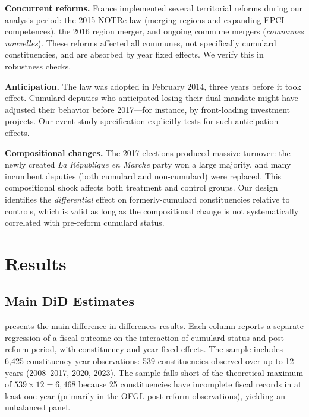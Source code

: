 \documentclass[12pt]{article}
\begin{document}
\textbf{Concurrent reforms.} France implemented several territorial reforms during our analysis period: the 2015 NOTRe law (merging regions and expanding EPCI competences), the 2016 region merger, and ongoing commune mergers (\textit{communes nouvelles}). These reforms affected all communes, not specifically cumulard constituencies, and are absorbed by year fixed effects. We verify this in robustness checks.

\textbf{Anticipation.} The law was adopted in February 2014, three years before it took effect. Cumulard deputies who anticipated losing their dual mandate might have adjusted their behavior before 2017---for instance, by front-loading investment projects. Our event-study specification explicitly tests for such anticipation effects.

\textbf{Compositional changes.} The 2017 elections produced massive turnover: the newly created \textit{La République en Marche} party won a large majority, and many incumbent deputies (both cumulard and non-cumulard) were replaced. This compositional shock affects both treatment and control groups. Our design identifies the \textit{differential} effect on formerly-cumulard constituencies relative to controls, which is valid as long as the compositional change is not systematically correlated with pre-reform cumulard status.


\section{Results}\label{sec:results}

\subsection{Main DiD Estimates}

 presents the main difference-in-differences results. Each column reports a separate regression of a fiscal outcome on the interaction of cumulard status and post-reform period, with constituency and year fixed effects. The sample includes 6,425 constituency-year observations: 539 constituencies observed over up to 12 years (2008--2017, 2020, 2023). The sample falls short of the theoretical maximum of $539 \times 12 = 6{,}468$ because 25 constituencies have incomplete fiscal records in at least one year (primarily in the OFGL post-reform observations), yielding an unbalanced panel.
\end{document}
